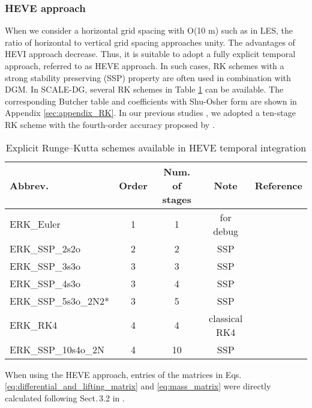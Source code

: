 \subsubsection{HEVE approach}
\label{sssec:temporal_discretization_heve}
When we consider a horizontal grid spacing with O(10 m) such as in LES, 
the ratio of horizontal to vertical grid spacing approaches unity. 
The advantages of HEVI approach decrease. 
Thus, 
it is suitable to adopt a fully explicit temporal approach, 
referred to as HEVE approach. 
In such cases, 
RK schemes with a strong stability preserving (SSP) property \citep{gottlieb2001} are often used in combination with DGM. 
In SCALE-DG, several RK schemes in Table \ref{tb:HEVE_temporal_integ_choice} can be available. 
The corresponding Butcher table and coefficients with Shu-Osher form are shown in Appendix \ref{sec:appendix_RK}. 
In our previous studies \citep{KT2023NumAccuracyDG,KT2025SCALEDG}, 
we adopted a ten-stage RK scheme with the fourth-order accuracy proposed by \cite{Ketcheson2008RK4o10s}. 

\begin{table}[t]
\caption{Explicit Runge--Kutta schemes available in HEVE temporal integration}
\begin{tabular}{l|cccc}
\hline
Abbrev. & Order & Num. of stages & Note & Reference \\
\hline
ERK\_Euler & 1 & 1 & for debug & \\
\hline
ERK\_SSP\_2s2o & 2 & 2 & SSP & \cite{SHU1988439} \\
\hline
ERK\_SSP\_3s3o & 3 & 3 & SSP & \cite{SHU1988439} \\
ERK\_SSP\_4s3o & 3 & 4 & SSP & \\
ERK\_SSP\_5s3o\_2N2* & 3 & 5 & SSP & \cite{higueras2019new} \\
\hline
ERK\_RK4 & 4 & 4 & classical RK4 & \\
ERK\_SSP\_10s4o\_2N & 4 & 10 & SSP & \cite{Ketcheson2008RK4o10s} \\
\hline
\end{tabular}
\label{tb:HEVE_temporal_integ_choice}
\end{table}


When using the HEVE approach, 
entries of the matrices in Eqs.\,\eqref{eq:differential_and_lifting_matrix} and \eqref{eq:mass_matrix}
were directly calculated following Sect.\,3.2 in \cite{hesthaven2007nodal}. 
